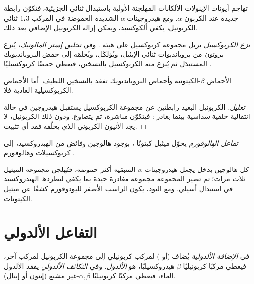 تهاجم أيونات الإينولات الألكانات المهلجنة الأولية باستبدال ثنائي الجزيئية، فتكوّن رابطة  جديدة عند
الكربون $\alpha$. ومع هيدروجينات $\alpha$ الشديدة الحموضة في المركب 1،3-ثنائي الكربونيل، يكفي
ألكوكسيد، ويمكن إزالة الكربونيل الإضافي بعد ذلك.

\begin{definition}\label{def:b2:enolates-aldol:decarboxylation}
\emph{نزع الكربوكسيل} يزيل مجموعة كربوكسيل على هيئة . وفي
\emph{تخليق إستر المالونيك}، يُنزع بروتون من بروبانديوات ثنائي الإيثيل،
ويُؤلكَل، ويُحلمَه إلى حمض البروبانديويك المستبدَل ثم يُنزع منه الكربوكسيل بالتسخين، فيعطي
حمضًا كربوكسيليًا .
\end{definition}

\begin{proposition}\label{prop:b2:enolates-aldol:decarboxylation}
الأحماض $\beta$-الكيتونية وأحماض البروبانديويك تفقد  بالتسخين اللطيف؛ أما الأحماض الكربوكسيلية العادية
فلا.
\end{proposition}

\begin{proof}[تعليل]
الكربونيل البعيد رابطتين عن مجموعة الكربوكسيل يستقبل هيدروجين  في حالة انتقالية
حلقية سداسية بينما يغادر : فيتكوّن  مباشرة، ثم يتصاوغ. ودون
ذلك الكربونيل، لا يجد الأنيون الكربوني الذي يخلّفه فقد  أي تثبيت.
\end{proof}

\begin{definition}\label{def:b2:enolates-aldol:haloform}
\emph{تفاعل الهالوفورم} يحوّل ميثيل كيتونًا ، بوجود
هالوجين وفائض من الهيدروكسيد، إلى كربوكسيلات  وهالوفورم .
\end{definition}

كل هالوجين يدخل يجعل هيدروجينات $\alpha$ المتبقية أكثر حموضة، فتُهلجن مجموعة الميثيل
ثلاث مرات؛ ثم تصير المجموعة  مجموعة مغادرة جيدة بما يكفي ليطردها الهيدروكسيد في
استبدال أسيلي. ومع اليود، يكون الراسب الأصفر لليودوفورم كشفًا عن ميثيل الكيتونات.

\section{التفاعل الألدولي}

\begin{definition}\label{def:b2:enolates-aldol:aldol}
في \emph{الإضافة الألدولية} يُضاف  (أو ) لمركب كربونيلي
إلى مجموعة الكربونيل لمركب آخر، فيعطي مركبًا كربونيليًا $\beta$-هيدروكسيليًا، هو
\emph{الألدول}. وفي \emph{التكاثف الألدولي} يفقد الألدول
الماء، فيعطي مركبًا كربونيليًا $\alpha,\beta$-غير مشبع (إينون أو إينال).
\end{definition}

